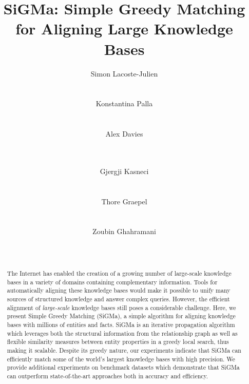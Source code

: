 \documentclass{sig-alternate}
\newcommand{\ts}[1]{\textsf{#1}}
\begin{document}
%
\title{SiGMa: Simple Greedy Matching\\ for Aligning Large Knowledge Bases}


%
%
%

\author{
%
\alignauthor
Simon Lacoste-Julien\\
       \\
       \\
%
\alignauthor
Konstantina Palla\\
       \\
       \\
%
\alignauthor Alex Davies\\
       \\
       \\
\and  %
%
\alignauthor Gjergji Kasneci\\
       \\
       \\
%
\alignauthor Thore Graepel\\
       \\
       \\
%
\alignauthor Zoubin Ghahramani\\
       \\
       \\
}


\maketitle
\begin{abstract}
The Internet has enabled the creation of a growing number of large-scale knowledge bases in a variety of domains containing complementary information. Tools for automatically aligning these knowledge bases would make it possible to unify many sources of structured knowledge and answer complex queries. However, the efficient alignment of \emph{large-scale} knowledge bases still poses a considerable challenge.  Here, we present \textsf{Simple Greedy Matching} (\textsf{SiGMa}), a simple algorithm for aligning knowledge bases with millions of entities and facts. \textsf{SiGMa} is an iterative propagation algorithm which leverages both the structural information from the relationship graph as well as flexible similarity measures between entity properties in a greedy local search, thus making it scalable. Despite its greedy nature, our experiments indicate that \textsf{SiGMa} can efficiently match some of the world's largest knowledge bases with high precision. We provide additional experiments on benchmark datasets which demonstrate that \ts{SiGMa} can outperform state-of-the-art approaches both in accuracy and efficiency.
\end{abstract}
\end{document}
